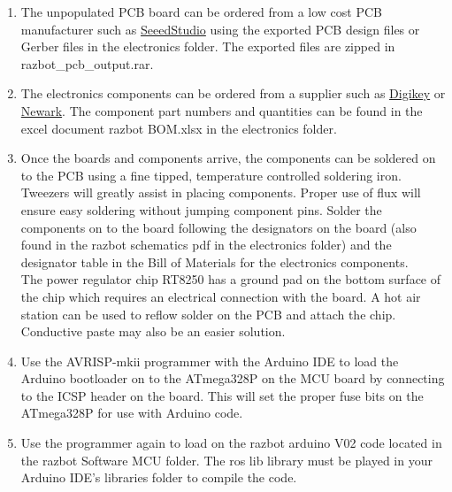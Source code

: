 \documentclass[12pt,titlepage,oneside]{memoir}
\begin{document}
\begin{enumerate}
\item The unpopulated PCB board can be ordered from a low cost PCB manufacturer such as \href{http://www.seeedstudio.com/}{SeeedStudio} using the exported PCB design files or Gerber files in the electronics folder. The exported files are zipped in razbot{\_}pcb{\_}output.rar.
\item The electronics components can be ordered from a supplier such as \href{http://www.digikey.com/}{Digikey} or \href{http://www.Newark.com/}{Newark}. The component part numbers and quantities can be found in the excel document razbot BOM.xlsx in the electronics folder.
\item Once the boards and components arrive, the components can be soldered on to the PCB using a fine tipped, temperature controlled soldering iron. Tweezers will greatly assist in placing components. Proper use of flux will ensure easy soldering without jumping component pins. Solder the components on to the board following the designators on the board (also found in the razbot schematics pdf in the electronics folder) and the designator table in the Bill of Materials for the electronics components.\\
The power regulator chip RT8250 has a ground pad on the bottom surface of the chip which requires an electrical connection with the board. A hot air station can be used to reflow solder on the PCB and attach the chip. Conductive paste may also be an easier solution.
\item Use the AVRISP-mkii programmer with the Arduino IDE to load the Arduino bootloader on to the ATmega328P on the MCU board by connecting to the ICSP header on the board. This will set the proper fuse bits on the ATmega328P for use with Arduino code.
\item Use the programmer again to load on the razbot arduino V02 code located in the razbot Software MCU folder. The ros lib library must be played in your Arduino IDE's libraries folder to compile the code. 
\end{enumerate}
\end{document}
